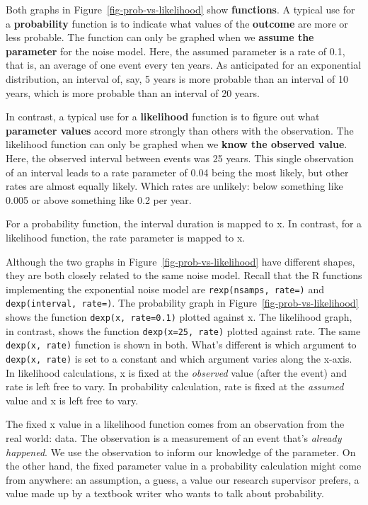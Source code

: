 \documentclass[
  letterpaper,
  DIV=11,
  numbers=noendperiod,
  oneside]{scrartcl}
\begin{document}
Both graphs in Figure~\ref{fig-prob-vs-likelihood} show
\textbf{functions}. A typical use for a \textbf{probability} function is
to indicate what values of the \textbf{outcome} are more or less
probable. The function can only be graphed when we \textbf{assume the
parameter} for the noise model. Here, the assumed parameter is a rate of
0.1, that is, an average of one event every ten years. As anticipated
for an exponential distribution, an interval of, say, 5 years is more
probable than an interval of 10 years, which is more probable than an
interval of 20 years.

In contrast, a typical use for a \textbf{likelihood} function is to
figure out what \textbf{parameter values} accord more strongly than
others with the observation. The likelihood function can only be graphed
when we \textbf{know the observed value}. Here, the observed interval
between events was 25 years. This single observation of an interval
leads to a rate parameter of 0.04 being the most likely, but other rates
are almost equally likely. Which rates are unlikely: below something
like 0.005 or above something like 0.2 per year.

For a probability function, the interval duration is mapped to x. In
contrast, for a likelihood function, the rate parameter is mapped to x.

Although the two graphs in Figure~\ref{fig-prob-vs-likelihood} have
different shapes, they are both closely related to the same noise model.
Recall that the R functions implementing the exponential noise model are
\texttt{rexp(nsamps,\ rate=)} and \texttt{dexp(interval,\ rate=)}. The
probability graph in Figure~\ref{fig-prob-vs-likelihood} shows the
function \texttt{dexp(x,\ rate=0.1)} plotted against x. The likelihood
graph, in contrast, shows the function \texttt{dexp(x=25,\ rate)}
plotted against rate. The same \texttt{dexp(x,\ rate)} function is shown
in both. What's different is which argument to \texttt{dexp(x,\ rate)}
is set to a constant and which argument varies along the x-axis. In
likelihood calculations, x is fixed at the \emph{observed} value (after
the event) and rate is left free to vary. In probability calculation,
rate is fixed at the \emph{assumed} value and x is left free to vary.

The fixed x value in a likelihood function comes from an observation
from the real world: data. The observation is a measurement of an event
that's \emph{already happened}. We use the observation to inform our
knowledge of the parameter. On the other hand, the fixed parameter value
in a probability calculation might come from anywhere: an assumption, a
guess, a value our research supervisor prefers, a value made up by a
textbook writer who wants to talk about probability.
\end{document}
